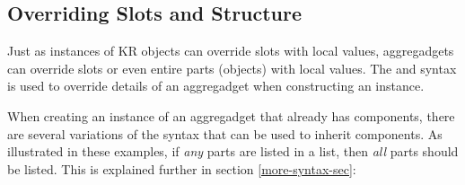 \subsection{Overriding Slots and Structure}
\label{overriding-slots}
Just as instances of
KR objects can override slots with local values, aggregadgets can override
slots or even entire parts (objects) with local values.  The 
and  syntax is used to override details of an
aggregadget when constructing an instance.

When creating an instance of an aggregadget that already has components,
there are several variations of the  syntax that can be used
to inherit components.  As illustrated in these examples, if {\it any} parts
are listed in
a  list, then {\it all} parts should be listed.  This is
explained further in section \ref{more-syntax-sec}:
